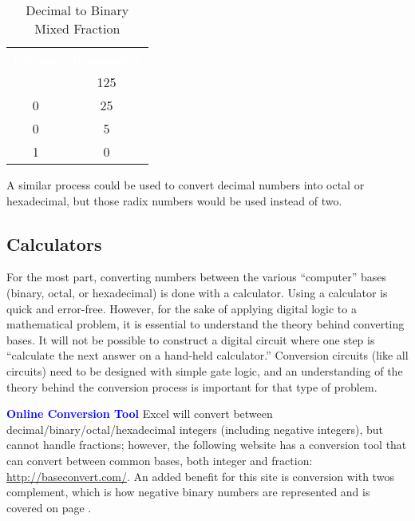  \begin{table}[H]
  \sffamily
  \newcommand{\head}[1]{\textcolor{white}{\textbf{#1}}}    
   \begin{center}
     \begin{tabular}{ c c } 
       \hline
      \rowcolor{black!75}
      \head{Integer} & \head{Remainder} \\
       & 125 \\
       0 & 25 \\
       0 & 5 \\
       1 & 0 \\ \hline
     \end{tabular}
   \end{center}
    \caption{Decimal to Binary Mixed Fraction}
    \label{MF:tab:dec_to_bin_mixed_fraction_part}
    \end{table} 
 
 A similar process could be used to convert decimal numbers into octal or hexadecimal, but those radix numbers would be used instead of two.
 
 \subsection{Calculators}
 \label{MF:sub:calculators}
 For the most part, converting numbers between the various ``computer'' bases (binary, octal, or hexadecimal) is done with a calculator. Using a calculator is quick and error-free. However, for the sake of applying digital logic to a mathematical problem, it is essential to understand the theory behind converting bases. It will not be possible to construct a digital circuit where one step is ``calculate the next answer on a hand-held calculator.'' Conversion circuits (like all circuits) need to be designed with simple gate logic, and an understanding of the theory behind the conversion process is important for that type of problem. 
 
 \begin{tcolorbox}[colback=blue!5!white,colframe=blue!75!black]
   \textcolor{blue}{\textbf{Online Conversion Tool}}
   \tcblower
   Excel will convert between decimal/binary/octal/hexadecimal integers (including negative integers), but cannot handle fractions; however, the following website has a conversion tool that can convert between common bases, both integer and fraction: \url{http://baseconvert.com/}. An added benefit for this site is conversion with twos complement, which is how negative binary numbers are represented and is covered on page \pageref{MO:subsub:signed_complement}.
 \end{tcolorbox}
 
